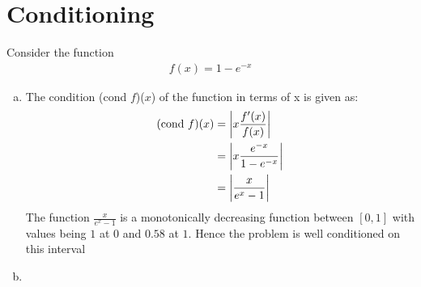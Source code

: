\section{Conditioning}
Consider the function
	\begin{align*}
		f(x) = 1 - e^{-x}
	\end{align*}
\begin{enumerate}[(a)]
	\item The condition (cond $f$)($x$) of the function in terms of x is given as:\\
			\begin{align*}
			(\mathrm{cond \ } f)(x)	&= \left|x \frac{f'(x)}{f(x)}\right|\\
								&= \left|x \frac{e^{-x}}{1-e^{-x}}\right|\\
								&= \left|\frac{x}{e^x -1}\right|
			\end{align*}
		The function $\frac{x}{e^x -1}$ is a monotonically decreasing function between $\left[0,1\right]$ with values being $1$ at $0$ and $0.58$ at $1$. Hence the problem is well conditioned on this interval
	\item 
\end{enumerate}